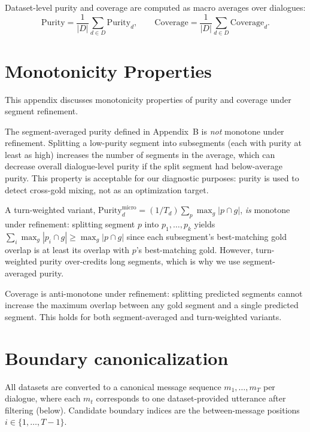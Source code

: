 Dataset-level purity and coverage are computed as macro averages over dialogues:
\[
\mathrm{Purity}
= \frac{1}{|D|} \sum_{d \in D} \mathrm{Purity}_d,
\qquad
\mathrm{Coverage}
= \frac{1}{|D|} \sum_{d \in D} \mathrm{Coverage}_d.
\]

\section{Monotonicity Properties}
\label{app:monotonicity}
This appendix discusses monotonicity properties of purity and coverage
under segment refinement.

The segment-averaged purity defined in Appendix~B is \emph{not} monotone
under refinement. Splitting a low-purity segment into subsegments
(each with purity at least as high) increases the number of segments in
the average, which can decrease overall dialogue-level purity if the
split segment had below-average purity. This property is acceptable for
our diagnostic purposes: purity is used to detect cross-gold mixing,
not as an optimization target.

A turn-weighted variant, $\mathrm{Purity}^{\mathrm{micro}}_d = (1/T_d)\sum_p \max_g |p \cap g|$,
\emph{is} monotone under refinement: splitting segment $p$ into $p_1,\dots,p_k$
yields $\sum_i \max_g |p_i \cap g| \ge \max_g |p \cap g|$ since each
subsegment's best-matching gold overlap is at least its overlap with $p$'s
best-matching gold. However, turn-weighted purity over-credits long segments,
which is why we use segment-averaged purity.

Coverage is anti-monotone under refinement: splitting predicted segments
cannot increase the maximum overlap between any gold segment and a single
predicted segment. This holds for both segment-averaged and turn-weighted
variants.

\section{Boundary canonicalization}
\makeatletter
\def\@currentlabelname{Window-tolerant F1 (W-F1)}
\makeatother
\label{app:canonicalization}

All datasets are converted to a canonical message sequence $m_1,\dots,m_T$ per dialogue, where each $m_t$ corresponds
to one dataset-provided utterance after filtering (below). Candidate boundary indices are the between-message positions
$i\in\{1,\dots,T-1\}$.

